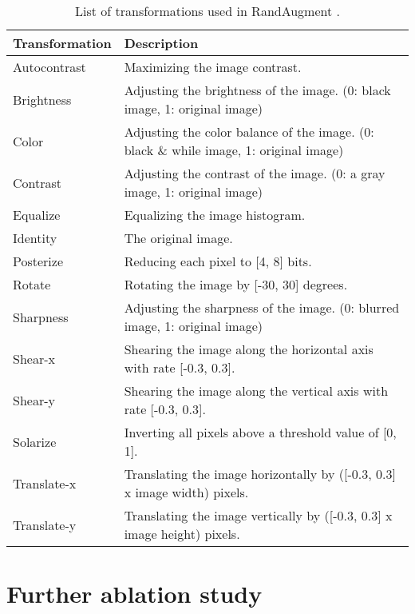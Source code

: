 \documentclass{article}
\begin{document}
\begin{table}[h]
    \caption{List of transformations used in RandAugment \cite{cubuk2020randaugment}.}
    \label{table:randaugment}
    
    \centering
    \begin{tabular}{m{2.2cm} m{9.0cm}}
        \toprule
        \textbf{Transformation} & \textbf{Description} \\
        \hline
        \noalign{\smallskip}
        Autocontrast   & Maximizing the image contrast. \\
        Brightness     & Adjusting the brightness of the image. (0: black image, 1: original image) \\
        Color          & Adjusting the color balance of the image. (0: black \& while image, 1: original image) \\
        Contrast       & Adjusting the contrast of the image. (0: a gray image, 1: original image) \\
        Equalize       & Equalizing the image histogram. \\
        Identity       & The original image. \\
        Posterize      & Reducing each pixel to [4, 8] bits. \\
        Rotate         & Rotating the image by [-30, 30] degrees. \\
        Sharpness      & Adjusting the sharpness of the image. (0: blurred image, 1: original image) \\
        Shear-x & Shearing the image along the horizontal axis with rate [-0.3, 0.3]. \\
        Shear-y        & Shearing the image along the vertical axis with rate [-0.3, 0.3]. \\
        Solarize       & Inverting all pixels above a threshold value of [0, 1]. \\
        Translate-x    & Translating the image horizontally by ([-0.3, 0.3] x image width) pixels. \\
        Translate-y    & Translating the image vertically by ([-0.3, 0.3] x image height) pixels. \\
        \bottomrule
    \end{tabular}
\end{table} \newpage
\section{Further ablation study}
\label{app:further-abliation-study}
\end{document}
